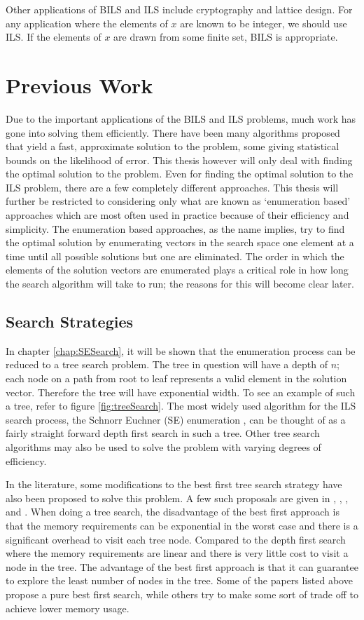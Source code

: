 \documentclass[12pt,Bold,letterpaper]{mcgilletdclass}
\newcommand{\vsp}{\vspace{\baselineskip}}
\begin{document}
Other applications of BILS and ILS include cryptography and lattice design. For any application where the elements of $x$
are known to be integer, we should use ILS. If the elements of $x$ are drawn from some finite set, BILS is appropriate.

\vsp \section{Previous Work} \label{sec:prevWork}
Due to the important applications of the BILS and ILS problems, much work has gone into solving them efficiently. There have been many algorithms proposed that yield a fast, approximate solution to the problem, some giving statistical bounds on the likelihood of error. This thesis however will only deal with finding the optimal solution to the problem.  Even for finding the optimal solution to the ILS problem, there are a few completely different approaches. This thesis will further be restricted to considering only what are known as `enumeration based' approaches which are most often used in practice because of their efficiency and simplicity. The enumeration based approaches, as the name implies, try to find the optimal solution by enumerating vectors in the search space one element at a time until all possible solutions but one are eliminated. The order in which the elements of the solution vectors are enumerated plays a critical role in how long the search algorithm will take to run; the reasons for this will become clear later.

\vsp \subsection{Search Strategies}
In chapter \ref{chap:SESearch}, it will be shown that the enumeration process can be reduced to a tree search problem. The tree in question will have a depth of $n$; each node on a path from root to leaf represents a valid element in the solution vector. Therefore the tree will have exponential width. To see an example of such a tree, refer to figure \ref{fig:treeSearch}. The most widely used algorithm for the ILS search process, the Schnorr Euchner (SE) enumeration \cite{SchE94}, can be thought of as a fairly straight forward depth first search in such a tree. Other tree search algorithms may also be used to solve the problem with varying degrees of efficiency.

In the literature, some modifications to the best first tree search strategy have also been proposed to solve this problem. A few such proposals are given in \cite{MurGDC06}, \cite{XuWZW04}, \cite{FukMU04}, \cite{StuBF07} and \cite{DaiY08}. When doing a tree search, the disadvantage of the best first approach is that the memory requirements can be exponential in the worst case and there is a significant overhead to visit each tree node. Compared to the depth first search where the memory requirements are linear and there is very little cost to visit a node in the tree. The advantage of the best first approach is that it can guarantee to explore the least number of nodes in the tree. Some of the papers listed above propose a pure best first search, while others try to make some sort of trade off to achieve lower memory usage.
\end{document}
